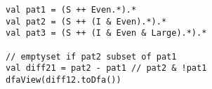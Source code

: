 \begin{lstlisting}[style=reclojureScala]
val pat1 = (S ++ Even.*).*
val pat2 = (S ++ (I & Even).*).*
val pat3 = (S ++ (I & Even & Large).*).*

// emptyset if pat2 subset of pat1
val diff21 = pat2 - pat1 // pat2 & !pat1
dfaView(diff12.toDfa())
\end{lstlisting}
